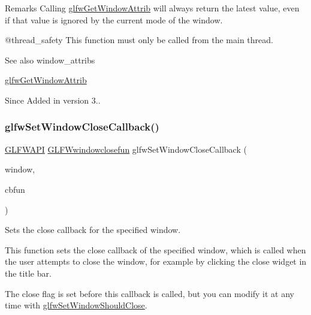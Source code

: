 \begin{DoxyRemark}{Remarks}
Calling \mbox{\hyperlink{group__window_ga1bb0c7e100418e284dbb800789c63d40}{glfw\+Get\+Window\+Attrib}} will always return the latest value, even if that value is ignored by the current mode of the window.
\end{DoxyRemark}
@thread\+\_\+safety This function must only be called from the main thread.

\begin{DoxySeeAlso}{See also}
window\+\_\+attribs 

\mbox{\hyperlink{group__window_ga1bb0c7e100418e284dbb800789c63d40}{glfw\+Get\+Window\+Attrib}}
\end{DoxySeeAlso}
\begin{DoxySince}{Since}
Added in version 3.. 
\end{DoxySince}
\mbox{\label{group__window_ga5b827da350141c789acd64f5c4f7a0e1}} 
\subsubsection{\texorpdfstring{glfwSetWindowCloseCallback()}{glfwSetWindowCloseCallback()}}
{\footnotesize\ttfamily \mbox{\hyperlink{glfw3_8h_a56da5036b2cc259351ae22fd6439bb47}{G\+L\+F\+W\+A\+PI}} \mbox{\hyperlink{group__window_ga93e7c2555bd837f4ed8b20f76cada72e}{G\+L\+F\+Wwindowclosefun}} glfw\+Set\+Window\+Close\+Callback (\begin{DoxyParamCaption}\item[{\mbox{\hyperlink{group__window_ga3c96d80d363e67d13a41b5d1821f3242}{G\+L\+F\+Wwindow}} $\ast$}]{window,  }\item[{\mbox{\hyperlink{group__window_ga93e7c2555bd837f4ed8b20f76cada72e}{G\+L\+F\+Wwindowclosefun}}}]{cbfun }\end{DoxyParamCaption})}



Sets the close callback for the specified window. 

This function sets the close callback of the specified window, which is called when the user attempts to close the window, for example by clicking the close widget in the title bar.

The close flag is set before this callback is called, but you can modify it at any time with \mbox{\hyperlink{group__window_ga1cadeda7a1e2f224e06a8415d30741aa}{glfw\+Set\+Window\+Should\+Close}}.

